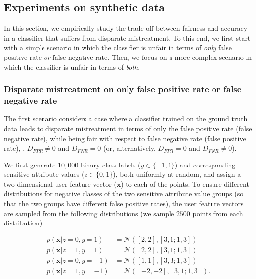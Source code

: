 \documentclass[letterpaper]{sig-alternate-2013}
\newcommand{\xhdr}[1]{\vspace{0.5mm}\noindent{{\bf #1.}}}
\newcommand{\disc}{disparate mistreatment}
\newcommand{\Disc}{Disparate mistreatment}
\begin{document}
\subsection{Experiments on synthetic data}
In this section, we empirically study the trade-off between fairness and accuracy in a classifier that suffers from  \disc{}.
To this end, we first start with a simple scenario in which the classifier is unfair  in terms of \textit{only} false positive rate \textit{or} false negative rate. Then, we focus on a more complex scenario in which the classifier is unfair in terms of \textit{both}.



\subsubsection{\Disc{} on \textbf{only} false positive rate \textbf{or} false negative rate}\label{sec:syn_disc_single}
\noindent
The first scenario considers a case where a classifier trained on the ground truth data leads to \disc{}  in terms of only the false positive rate (false negative rate), while being fair with respect to false negative rate (false positive rate), \ie, $D_{FPR} \neq 0$ and $D_{FNR} = 0$ (or, alternatively, $D_{FPR} = 0$ and $D_{FNR} \neq 0$).




\vspace{1.5mm}
\xhdr{Experimental setup}
We first generate $10{,}000$ binary class labels ($y \in \{-1, 1\}$) and corresponding sensitive attribute values ($z \in \{0, 1\}$), both uniformly at random, and assign
a two-dimensional user feature vector ($\mathbf{x}$) to each of the points.
To ensure different distributions for negative classes of the two sensitive attribute value groups (so that the two groups have different false positive rates), the user feature vectors are sampled from the following distributions (we sample $2500$ points from each distribution):


\vspace{-4mm}
\begin{align}
p(\mathbf{x}|z=0, y=1) &= \mathcal{N}([2,2], [3, 1; 1, 3]) \nonumber \\
p(\mathbf{x}|z=1, y=1) &= \mathcal{N}([2,2], [3, 1; 1, 3]) \nonumber \\
p(\mathbf{x}|z=0, y=-1) &= \mathcal{N}([1,1], [3, 3; 1, 3]) \nonumber \\
p(\mathbf{x}|z=1, y=-1) &= \mathcal{N}([-2,-2], [3, 1; 1, 3]). \nonumber
\end{align}
\end{document}
